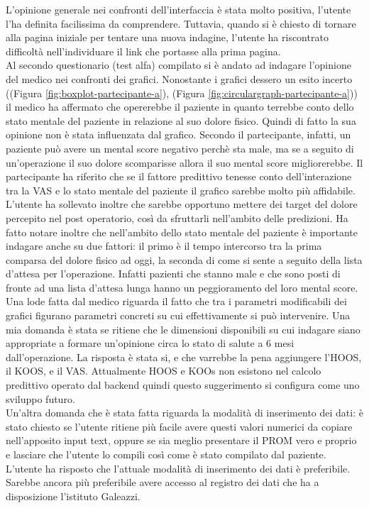L'opinione generale nei confronti dell'interfaccia è stata molto positiva, l'utente l'ha definita facilissima da comprendere. Tuttavia, quando si è chiesto di tornare alla pagina iniziale per tentare una nuova indagine, l'utente ha riscontrato difficoltà nell'individuare il link che portasse alla prima pagina. \\
Al secondo questionario (test alfa) compilato si è andato ad indagare l'opinione del medico nei confronti dei grafici. Nonostante i grafici dessero un esito incerto ((Figura \ref{fig:boxplot-partecipante-a}), (Figura \ref{fig:circulargraph-partecipante-a})) il medico ha affermato che opererebbe il paziente in quanto terrebbe conto dello stato mentale del paziente in relazione al suo dolore fisico. Quindi di fatto la sua opinione non è stata influenzata dal grafico. Secondo il partecipante, infatti, un paziente può avere un mental score negativo perchè sta male, ma se a seguito di un'operazione il suo dolore scomparisse allora il suo mental score migliorerebbe. Il partecipante ha riferito che se il fattore predittivo tenesse conto dell'interazione tra la VAS e lo stato mentale del paziente il grafico sarebbe molto più affidabile.\\
L'utente ha sollevato inoltre che sarebbe opportuno mettere dei target del dolore percepito nel post operatorio, così da sfruttarli nell'ambito delle predizioni. Ha fatto notare inoltre che nell'ambito dello stato mentale del paziente è importante indagare anche su due fattori: il primo è il tempo intercorso tra la prima comparsa del dolore fisico ad oggi, la seconda di come si sente a seguito della lista d'attesa per l'operazione. Infatti pazienti che stanno male e che sono posti di fronte ad una lista d'attesa lunga hanno un peggioramento del loro mental score. \\
Una lode fatta dal medico riguarda il fatto che tra i parametri modificabili dei grafici figurano parametri concreti su cui effettivamente si può intervenire. Una mia domanda è stata se ritiene che le dimensioni disponibili su cui indagare siano appropriate a formare un'opinione circa lo stato di salute a 6 mesi dall'operazione. La risposta è stata si, e che varrebbe la pena aggiungere l'HOOS, il KOOS, e il VAS. Attualmente HOOS e KOOs non esistono nel calcolo predittivo operato dal backend quindi questo suggerimento si configura come uno sviluppo futuro. \\
Un'altra domanda che è stata fatta riguarda la modalità di inserimento dei dati: è stato chiesto se l'utente ritiene più facile avere questi valori numerici da copiare nell'apposito input text, oppure se sia meglio presentare il PROM vero e proprio e lasciare che l'utente lo compili così come è stato compilato dal paziente. L'utente ha risposto che l'attuale modalità di inserimento dei dati è preferibile. Sarebbe ancora più preferibile avere accesso al registro dei dati che ha a disposizione l'istituto Galeazzi. 


